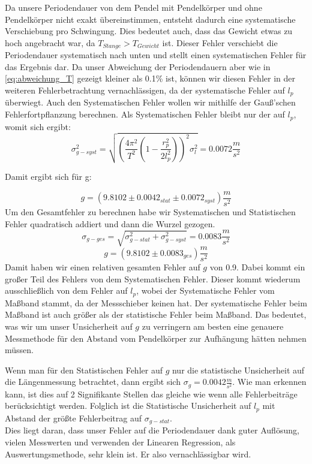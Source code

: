\documentclass[twoside]{protokoll}
\begin{document}
Da unsere Periodendauer von dem Pendel mit Pendelkörper und ohne Pendelkörper nicht exakt übereinstimmen, entsteht dadurch eine systematische Verschiebung pro Schwingung.
Dies bedeutet auch, dass das Gewicht etwas zu hoch angebracht war, da $T_{Stange} > T_{Gewicht}$ ist.
Dieser Fehler verschiebt die Periodendauer systematisch nach unten und stellt einen systematischen Fehler für das Ergebnis dar.
Da unser Abweichung der Periodendauern aber wie in \ref{eq:abweichung_T} gezeigt kleiner als 0.1\% ist, können wir diesen Fehler in der weiteren Fehlerbetrachtung vernachlässigen, da der systematische Fehler auf $l_p$ überwiegt.
Auch den Systematischen Fehler wollen wir mithilfe der Gauß'schen Fehlerfortpflanzung berechnen.
Als Systematischen Fehler bleibt nur der auf $l_p$, womit sich ergibt:
\begin{equation}
    \sigma_{g-syst}^2 =  \sqrt{\left(\frac{4\pi^2}{T^2}\left(1-\frac{r_p^2}{2l_p^2}\right)\right)^2\sigma_l^2} = 0.0072 \frac{m}{s^2}
\end{equation}

Damit ergibt sich für g:

\begin{equation}
    g = (9.8102 \pm 0.0042_{stat} \pm 0.0072_{syst}) \frac{m}{s^2}
\end{equation}
Um den Gesamtfehler zu berechnen habe wir Systematischen und Statistischen Fehler quadratisch addiert und dann die Wurzel gezogen.
\begin{equation}
    \sigma_{g-ges} = \sqrt{\sigma_{g-stat}^2 + \sigma_{g-syst}^2} = 0.0083 \frac{m}{s^2}
\end{equation}
\begin{equation}
    g = (9.8102 \pm 0.0083_{ges}) \frac{m}{s^2}
\end{equation}
Damit haben wir einen relativen gesamten Fehler auf $g$ von 0.9\textperthousand.
Dabei kommt ein großer Teil des Fehlers von dem Systematischen Fehler.
Dieser kommt wiederum ausschließlich von dem Fehler auf $l_p$, wobei der Systematische Fehler vom Maßband stammt, da der Messschieber keinen hat.
Der systematische Fehler beim Maßband ist auch größer als der statistische Fehler beim Maßband.
Das bedeutet, was wir um unser Unsicherheit auf $g$ zu verringern am besten eine genauere Messmethode für den Abstand vom Pendelkörper zur Aufhängung hätten nehmen müssen.

Wenn man für den Statistischen Fehler auf $g$ nur die statistische Unsicherheit auf die Längenmessung betrachtet, dann ergibt sich $\sigma_{g} = 0.0042 \frac{m}{s^2}$.
Wie man erkennen kann, ist dies auf 2 Signifikante Stellen das gleiche wie wenn alle  Fehlerbeiträge berücksichtigt werden.
Folglich ist die Statistische Unsicherheit auf $l_p$ mit Abstand der größte Fehlerbeitrag auf $\sigma_{g-stat}$. \\
Dies liegt daran, dass unser Fehler auf die Periodendauer dank guter Auflösung, vielen Messwerten und verwenden der Linearen Regression, als Auswertungsmethode, sehr klein ist. 
Er also vernachlässigbar wird. \\
\end{document}
